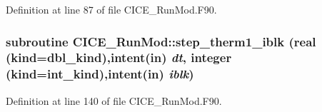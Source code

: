 Definition at line 87 of file CICE\_\-RunMod.F90.\hypertarget{namespaceCICE__RunMod_a111ec6740d3c04411c4a93a7d7c129bf}{
\subsubsection[{step\_\-therm1\_\-iblk}]{\setlength{\rightskip}{0pt plus 5cm}subroutine CICE\_\-RunMod::step\_\-therm1\_\-iblk (real (kind=dbl\_\-kind),intent(in) {\em dt}, \/  integer (kind=int\_\-kind),intent(in) {\em iblk})}}
\label{namespaceCICE__RunMod_a111ec6740d3c04411c4a93a7d7c129bf}


Definition at line 140 of file CICE\_\-RunMod.F90.